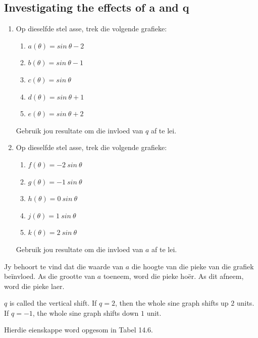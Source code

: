\subsection*{Investigating the effects of a and q}
\nopagebreak
\begin{enumerate}[noitemsep, label=\textbf{\arabic*}. ] 
\item Op dieselfde stel asse, trek die volgende grafieke:
\begin{enumerate}[noitemsep, label=\textbf{\alph*}. ] 
\item $a(\theta )=sin~\theta -2$
\item $b(\theta )=sin~\theta -1$
\item $c(\theta )=sin~\theta $
\item $d(\theta )=sin~\theta +1$
\item $e(\theta )=sin~\theta +2$
\end{enumerate}
Gebruik jou resultate om die invloed van $q$ af te lei.
\item Op dieselfde stel asse, trek die volgende grafieke:
\begin{enumerate}[noitemsep, label=\textbf{\alph*}. ] 
\item $f(\theta )=-2~sin~\theta $
\item $g(\theta )=-1~sin~\theta $
\item $h(\theta )=0~sin~\theta $
\item $j(\theta )=1~sin~\theta $
\item $k(\theta )=2~sin~\theta $\end{enumerate}
Gebruik jou resultate om die invloed van $a$ af te lei.
\end{enumerate}
Jy behoort te vind dat die waarde van $a$ die hoogte van die pieke van die grafiek beïnvloed. As die grootte van $a$ toeneem, word die pieke hoër. As dit afneem, word die pieke laer.\par 
$q$ is called the vertical shift. If $q=2$, then the whole sine graph shifts up $2$ units. If $q=-1$, the whole sine graph shifts down $1$ unit.\par 
Hierdie eienskappe word opgesom in Tabel 14.6.\par 
